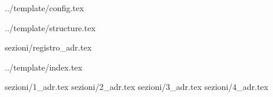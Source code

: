  {../template/config.tex}


\def\DOCUMENTO{Analisi dei Requisiti}
\def\VERSIONE{1.0.0}

\def\DESCRIZIONE{<Info documento>}

\def\REDATTORE {Gino Zaidan\\ & Francesco Bizzaro}
\def\VERIFICATORE {Federico Rossetto \\ & Riccardo Rizzo}
\def\RESPONSABILE {Alberto Andriolo}

\def\USO {Esterno}

\def\DISTRIBUZIONE {\GRUPPO{}\\ & \COMMITTENTE{}\\}

\def\DESCRIZIONE {Documento che contiene l'analisi dei requisiti ricavati dal gruppo 
Stark Labs per la realizzazione del progetto SiVoDiM}


\def\INDICE	{true}
\def\TABELLE {true}
\def\FIGURE {true}


 {../template/structure.tex}

 {sezioni/registro_adr.tex}

 {../template/index.tex}


 {sezioni/1_adr.tex}
 {sezioni/2_adr.tex}
 {sezioni/3_adr.tex}
 {sezioni/4_adr.tex}





